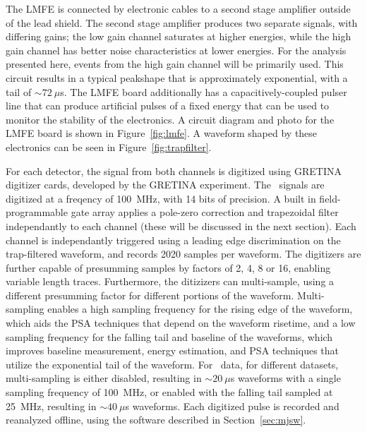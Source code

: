 \documentclass[/main.tex]{subfiles}
\begin{document}
The LMFE is connected by electronic cables to a second stage amplifier outside of the lead shield.
The second stage amplifier produces two separate signals, with differing gains; the low gain channel saturates at higher energies, while the high gain channel has better noise characteristics at lower energies.
For the analysis presented here, events from the high gain channel will be primarily used.
This circuit results in a typical peakshape that is approximately exponential, with a tail of ${\sim}72~\mu$s.
The LMFE board additionally has a capacitively-coupled pulser line that can produce artificial pulses of a fixed energy that can be used to monitor the stability of the electronics.
A circuit diagram and photo for the LMFE board is shown in Figure~\ref{fig:lmfe}.
A waveform shaped by these electronics can be seen in Figure~\ref{fig:trapfilter}.

For each detector, the signal from both channels is digitized using GRETINA digitizer cards, developed by the GRETINA experiment\cite{zimmermann2012}.
The \MJD\ signals are digitized at a freqency of 100~MHz, with 14 bits of precision.
A built in field-programmable gate array applies a pole-zero correction and trapezoidal filter independantly to each channel (these will be discussed in the next section).
Each channel is independantly triggered using a leading edge discrimination on the trap-filtered waveform, and records 2020 samples per waveform.
The digitizers are further capable of presumming samples by factors of 2, 4, 8 or 16, enabling variable length traces.
Furthermore, the ditizizers can multi-sample, using a different presumming factor for different portions of the waveform.
Multi-sampling enables a high sampling frequency for the rising edge of the waveform, which aids the PSA techniques that depend on the waveform risetime, and a low sampling frequency for the falling tail and baseline of the waveforms, which improves baseline measurement, energy estimation, and PSA techniques that utilize the exponential tail of the waveform.
For \MJD\ data, for different datasets, multi-sampling is either disabled, resulting in ${\sim}20~\mu$s waveforms with a single sampling frequency of 100~MHz, or enabled with the falling tail sampled at 25~MHz, resulting in ${\sim}40~\mu$s waveforms.
Each digitized pulse is recorded and reanalyzed offline, using the software described in Section~\ref{sec:mjsw}.
\end{document}
